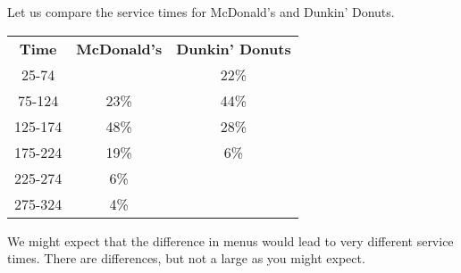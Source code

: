 \documentclass{beamer}
\begin{document}
\begin{frame}
\begin{example}
Let us compare the service times for McDonald's and Dunkin' Donuts.
\begin{center}
\begin{tabular}{ccc}
\textbf{Time} & \textbf{McDonald's} & \textbf{Dunkin' Donuts}\\
25-74   &      & 22\% \\
75-124  & 23\% & 44\% \\
125-174 & 48\% & 28\% \\
175-224 & 19\% & \phantom{0}6\% \\
225-274 & \phantom{0}6\% & \\
275-324 & \phantom{0}4\% &
\end{tabular}
\end{center}\pause

We might expect that the difference in menus would lead to very different service times. There are differences, but not a large as you might expect.
\end{example}
\end{frame}
\end{document}
